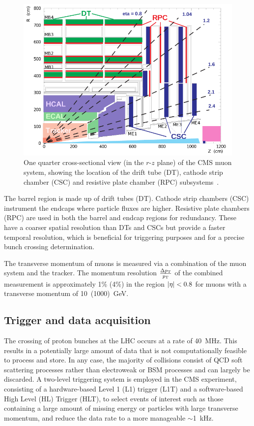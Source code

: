 \begin{figure}
\begin{center}
\includegraphics[width=0.7\linewidth]{figs/detector/muondet}
\end{center}
\caption{One quarter cross-sectional view (in the $r$-$z$ plane) of the CMS 
muon system, showing the location of the drift tube (DT), cathode strip chamber 
(CSC) and resistive plate chamber (RPC) subsystems~\cite{cms}.}
\label{fig:muondet}
\end{figure}

The barrel region is made up of drift tubes (DT). Cathode strip chambers (CSC) 
instrument the endcaps where particle fluxes are higher. Resistive plate 
chambers (RPC) are used in both the barrel and endcap regions for redundancy. 
These have a coarser spatial resolution than DTs and CSCs but provide a faster 
temporal resolution, which is beneficial for triggering purposes and for a 
precise bunch crossing determination.

The transverse momentum of muons is measured via a combination of the muon 
system and the tracker. The momentum resolution $\frac{\Delta{p_{\text T}}}{{p_{\text T}}}$ of the 
combined measurement is approximately 1\% (4\%) in the region $|\eta|<0.8$ for 
muons with a transverse momentum of 10~(1000)~GeV.

\subsection{Trigger and data acquisition}
The crossing of proton bunches at the LHC occurs at a rate of 40~MHz. This 
results in a potentially large amount of data that is not computationally 
feasible to process and store. In any case, the majority of collisions consist 
of QCD soft scattering processes rather than electroweak or BSM processes and 
can largely be discarded. A two-level triggering system is employed in the CMS 
experiment, consisting of a hardware-based Level 1 (L1) trigger (L1T) and a 
software-based High Level (HL) Trigger (HLT), to select events of interest such 
as those containing a large amount of missing energy or particles with large 
transverse momentum, and reduce the data rate to a more manageable $\sim$1~kHz.

